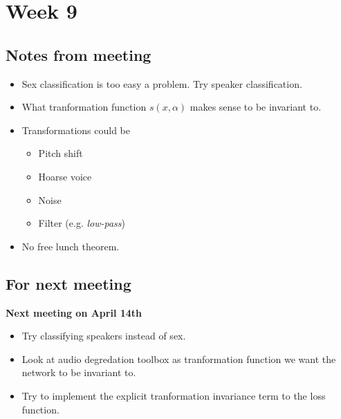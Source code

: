 
\section{Week 9}

\subsection{Notes from meeting}

\begin{itemize}
\item Sex classification is too easy a problem. Try speaker classification.
\item What tranformation function $s(x, \alpha)$ makes sense to be invariant to.
\item Transformations could be
\begin{itemize}
  \item Pitch shift
  \item Hoarse voice
  \item Noise
  \item Filter (e.g. \textit{low-pass})
\end{itemize}
\item No free lunch theorem.
\end{itemize}

\subsection{For next meeting}

\textbf{Next meeting on April 14th}

\begin{itemize}
\item Try classifying speakers instead of sex.
\item Look at audio degredation toolbox as tranformation function we want the network to be invariant to.
\item Try to implement the explicit tranformation invariance term to the loss function.
\end{itemize}
